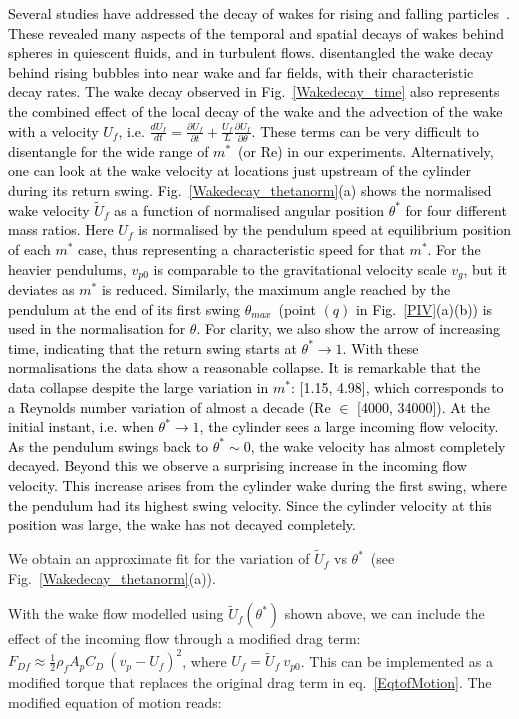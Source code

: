 \documentclass{jfm}
\begin{document}
{\textcolor{black}{Several studies have addressed the decay of wakes for rising and falling particles~\citep{wu1993sphere,bagchi2004response}. These revealed many aspects of the temporal and spatial decays of wakes behind spheres in quiescent fluids, and in turbulent flows. \cite{almeras2017experimental} disentangled the wake decay behind rising bubbles into near wake and far fields, with their characteristic decay rates. The wake decay observed in Fig.~\ref{Wakedecay_time} also represents the combined effect of the local decay of the wake and the advection of the wake with a velocity $U_f$, i.e. $\frac{d{U_f}}{dt} = \frac{\partial{U_f}}{\partial t} + \frac{U_f}{L} \frac{\partial{U_f}}{\partial \theta}$. These terms can be very difficult to disentangle for the wide range of $m^*$~(or Re) in our experiments. Alternatively, one can look at the wake velocity at locations just upstream of the cylinder during its return swing. Fig.~\ref{Wakedecay_thetanorm}(a) shows the normalised wake velocity $\tilde{U}_f$ as a function of normalised angular position $\theta^*$ for four different mass ratios.  Here  $U_f$ is normalised by the pendulum speed at equilibrium position of each $m^*$ case, thus representing a characteristic speed for that $m^*$. For the heavier pendulums, $v_{p0}$ is comparable to the gravitational velocity scale $v_g$, but it deviates as $m^*$ is reduced. Similarly, the maximum angle reached by the pendulum at the end of its first swing $\theta_{max}$~(point $(q)$ in Fig.~\ref{PIV}(a)(b)) is used in the normalisation for $\theta$. For clarity, we also show the arrow of increasing time, indicating that the return swing starts at $\theta^* \to 1$. With these normalisations the data show a reasonable collapse. It is remarkable that the data collapse despite the large variation in $m^*$: [1.15, 4.98], which corresponds to a Reynolds number variation of almost a decade (Re $\in$ [4000, 34000]). At the initial instant, i.e. when $\theta^* \to 1$, the cylinder sees a large incoming flow velocity. As the pendulum swings back to $\theta^* \sim 0$, the wake velocity has almost completely decayed. Beyond this we observe a surprising increase in the incoming flow velocity. This increase arises from the cylinder wake during the first swing, where the pendulum had its highest swing velocity. Since the cylinder velocity at this position was large, the wake has not decayed completely.}
	
	
	 We obtain an approximate fit for the variation of $\tilde{U}_f$ vs $\theta^*$~(see Fig.~\ref{Wakedecay_thetanorm}(a)).  {\color{black} With the wake flow modelled using $\tilde{U}_f(\theta^*)$ shown above, we can include the effect of the incoming flow through a modified drag term: $ F_{Df} \approx \frac{1}{2} \rho_f A_p C_D \ (v_p - U_f)^2$, where $U_f = \tilde{U}_f \ v_{p0}$. This can be implemented as a modified torque  that replaces the original drag term in eq.~\ref{EqtofMotion}. The modified equation of motion reads: 
	
}}
\end{document}
